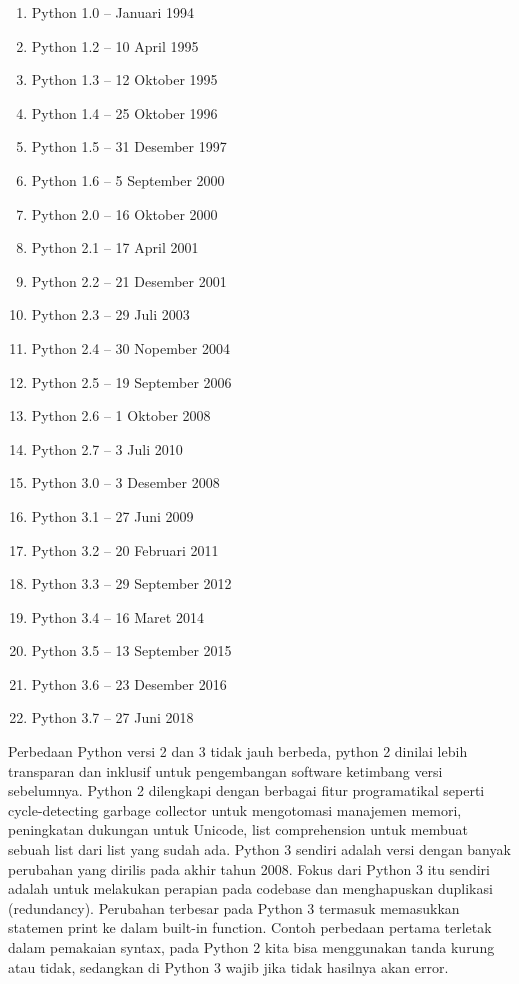 \documentclass{article}
\begin{document}
            \begin{enumerate}
            \item Python 1.0 – Januari 1994
            \item Python 1.2 – 10 April 1995
            \item Python 1.3 – 12 Oktober 1995
            \item Python 1.4 – 25 Oktober 1996
            \item Python 1.5 – 31 Desember 1997
            \item Python 1.6 – 5 September 2000
            \item Python 2.0 – 16 Oktober 2000
            \item Python 2.1 – 17 April 2001
            \item Python 2.2 – 21 Desember 2001
            \item Python 2.3 – 29 Juli 2003
            \item Python 2.4 – 30 Nopember 2004
            \item Python 2.5 – 19 September 2006
            \item Python 2.6 – 1 Oktober 2008
            \item Python 2.7 – 3 Juli 2010
            \item Python 3.0 – 3 Desember 2008
            \item Python 3.1 – 27 Juni 2009
            \item Python 3.2 – 20 Februari 2011
            \item Python 3.3 – 29 September 2012
            \item Python 3.4 – 16 Maret 2014
            \item Python 3.5 – 13 September 2015
            \item Python 3.6 – 23 Desember 2016
            \item Python 3.7 – 27 Juni 2018
            \end{enumerate}
        \par Perbedaan Python versi 2 dan 3 tidak jauh berbeda, python 2 dinilai lebih transparan dan inklusif untuk pengembangan software ketimbang versi sebelumnya. Python 2 dilengkapi dengan berbagai fitur programatikal seperti cycle-detecting garbage collector untuk mengotomasi manajemen memori, peningkatan dukungan untuk Unicode, list comprehension untuk membuat sebuah list dari list yang sudah ada. Python 3 sendiri adalah versi dengan banyak perubahan yang dirilis pada akhir tahun 2008. Fokus dari Python 3 itu sendiri adalah untuk melakukan perapian pada codebase dan menghapuskan duplikasi (redundancy). Perubahan terbesar pada Python 3 termasuk memasukkan statemen print ke dalam built-in function. Contoh perbedaan pertama terletak dalam pemakaian syntax, pada Python 2 kita bisa menggunakan tanda kurung atau tidak, sedangkan di Python 3 wajib jika tidak hasilnya akan error. 
        
\end{document}
